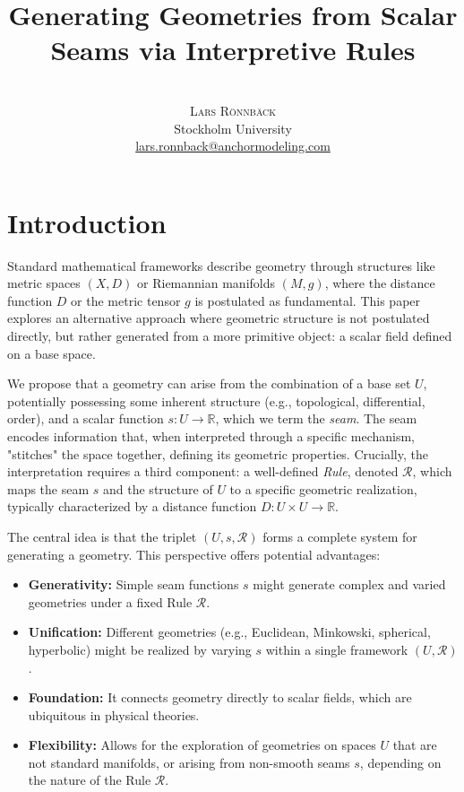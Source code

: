 \documentclass[twoside,twocolumn]{article}
\title{\vspace{5mm}\fontsize{24pt}{10pt}\selectfont\textbf{Generating Geometries from Scalar Seams via Interpretive Rules}} %
\author{%
\\[2mm] %
\textsc{Lars Rönnbäck}%
\\[1ex] %
\normalsize Stockholm University \\ %
\normalsize \href{mailto:lars.ronnback@anchormodeling.com}{lars.ronnback@anchormodeling.com} %
\\[1ex] %
}
\date{}
\begin{document}
\maketitle
\thispagestyle{fancy}


\section{Introduction}

Standard mathematical frameworks describe geometry through structures like metric spaces $(X, D)$ or Riemannian manifolds $(M, g)$, where the distance function $D$ or the metric tensor $g$ is postulated as fundamental. This paper explores an alternative approach where geometric structure is not postulated directly, but rather generated from a more primitive object: a scalar field defined on a base space.

We propose that a geometry can arise from the combination of a base set $U$, potentially possessing some inherent structure (e.g., topological, differential, order), and a scalar function $s: U \to \mathbb{R}$, which we term the \emph{seam}. The seam encodes information that, when interpreted through a specific mechanism, "stitches" the space together, defining its geometric properties. Crucially, the interpretation requires a third component: a well-defined \emph{Rule}, denoted $\mathcal{R}$, which maps the seam $s$ and the structure of $U$ to a specific geometric realization, typically characterized by a distance function $D: U \times U \to \mathbb{R}$.

The central idea is that the triplet $(U, s, \mathcal{R})$ forms a complete system for generating a geometry. This perspective offers potential advantages:
\begin{itemize}
    \item \textbf{Generativity:} Simple seam functions $s$ might generate complex and varied geometries under a fixed Rule $\mathcal{R}$.
    \item \textbf{Unification:} Different geometries (e.g., Euclidean, Minkowski, spherical, hyperbolic) might be realized by varying $s$ within a single framework $(U, \mathcal{R})$.
    \item \textbf{Foundation:} It connects geometry directly to scalar fields, which are ubiquitous in physical theories.
    \item \textbf{Flexibility:} Allows for the exploration of geometries on spaces $U$ that are not standard manifolds, or arising from non-smooth seams $s$, depending on the nature of the Rule $\mathcal{R}$.
\end{itemize}
\end{document}
